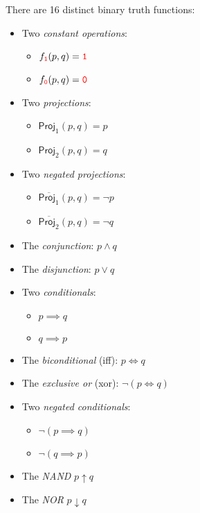 \begin{tcolorbox}[colframe=corcolor,title={\color{white}\bf Binary Truth Functions}]
	\begin{corollary}
		There are 16 distinct binary truth functions:
		\begin{itemize}
			\item Two \textit{constant operations}:
			\begin{itemize}
				\item $f_{\textcolor{red}{\texttt 1}}(p,q)=\textcolor{red}{\texttt 1}$
				\item $f_{\textcolor{red}{\texttt 0}}(p,q)=\textcolor{red}{\texttt 0}$
			\end{itemize}
			\item Two \textit{projections}:
			\begin{itemize}
				\item $\mathsf{Proj}_1(p,q)=p$
				\item $\mathsf{Proj}_2(p,q)=q$
			\end{itemize} 
			\item Two \textit{negated projections}:
			\begin{itemize}
				\item $\overline{\mathsf{Proj}_1}(p,q)=\lnot p$
				\item $\overline{\mathsf{Proj}_2}(p,q)=\lnot q$
			\end{itemize} 
			\item The \textit{conjunction}: $p\land q$
			\item The \textit{disjunction}: $p\lor q$
			\item Two \textit{conditionals}:
			\begin{itemize}
				\item $p\implies q$
				\item $q\implies p$
			\end{itemize}
			\item The \textit{biconditional} (iff): $p\iff q$
			\item The \textit{exclusive or} (xor): $\lnot(p\iff q)$
			\item Two \textit{negated conditionals}:
			\begin{itemize}
				\item $\lnot(p\implies q)$
				\item $\lnot(q\implies p)$
			\end{itemize}
			\item The \textit{NAND} $p\uparrow q$
			\item The \textit{NOR} $p\downarrow q$
		\end{itemize}
	\end{corollary}
\end{tcolorbox}
